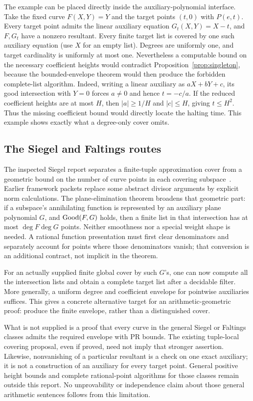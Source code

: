 The example can be placed directly inside the auxiliary-polynomial
interface. Take the fixed curve \(F(X,Y)=Y\) and the target points
\((t,0)\) with \(P(e,t)\). Every target point admits the linear
auxiliary equation \(G_t(X,Y)=X-t\), and \(F,G_t\) have a nonzero
resultant. Every finite target list is covered by one such auxiliary
equation (use \(X\) for an empty list). Degrees are uniformly one,
and target cardinality is uniformly at most one. Nevertheless a
computable bound on the necessary coefficient heights would contradict
Proposition~\ref{prop:singleton}, because the bounded-envelope theorem
would then produce the forbidden complete-list algorithm.
Indeed, writing a linear auxiliary as \(aX+bY+c\), its good
intersection with \(Y=0\) forces \(a\ne0\) and hence
\(t=-c/a\). If the reduced coefficient heights are at most \(H\),
then \(|a|\ge1/H\) and \(|c|\le H\), giving \(t\le H^2\).
Thus the missing coefficient bound would directly locate the halting
time. This example shows exactly what a degree-only cover omits.

\subsection{The Siegel and Faltings routes}

The inspected Siegel report separates a finite-tuple approximation
cover from a geometric bound on the number of curve points in each
covering subspace~\cite{repo-siegel}. Earlier framework packets replace
some abstract divisor arguments by explicit norm calculations.
The plane-elimination theorem broadens that geometric part: if a
subspace's annihilating function is represented by an auxiliary plane
polynomial \(G\), and \(\operatorname{Good}(F,G)\) holds, then a finite list in
that intersection has at most \(\deg F\deg G\) points. Neither
smoothness nor a special weight shape is needed. A rational function
presentation must first clear denominators and separately account for
points where those denominators vanish; that conversion is an
additional contract, not implicit in the theorem.

For an actually supplied finite global cover by such \(G\)'s, one can
now compute all the intersection lists and obtain a complete target
list after a decidable filter. More generally, a uniform degree and
coefficient envelope for pointwise auxiliaries suffices. This gives
a concrete alternative target for an arithmetic-geometric proof:
produce the finite envelope, rather than a distinguished cover.

What is not supplied is a proof that every curve in the general Siegel
or Faltings classes admits the required envelope with PR bounds.
The existing tuple-local covering proposal, even if proved, need not
imply that stronger assertion. Likewise, nonvanishing of a particular
resultant is a check on one exact auxiliary; it is not a construction
of an auxiliary for every target point. General positive height
bounds and complete rational-point algorithms for those classes
remain outside this report. No unprovability or independence claim
about those general arithmetic sentences follows from this limitation.

